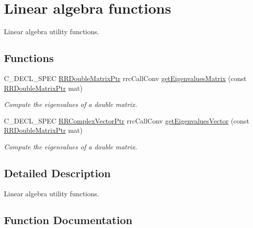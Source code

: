 \hypertarget{group___linear_algebra}{}\section{Linear algebra functions}
\label{group___linear_algebra}


Linear algebra utility functions.  


\subsection*{Functions}
\begin{DoxyCompactItemize}
\item 
C\+\_\+\+D\+E\+C\+L\+\_\+\+S\+P\+E\+C \hyperlink{rrc__types_8h_ae586a879d30f0823087e42d93464b5dd}{R\+R\+Double\+Matrix\+Ptr} rrc\+Call\+Conv \hyperlink{group___linear_algebra_ga142092d1f7edcc6500f1b965abed68be}{get\+Eigenvalues\+Matrix} (const \hyperlink{rrc__types_8h_ae586a879d30f0823087e42d93464b5dd}{R\+R\+Double\+Matrix\+Ptr} mat)
\begin{DoxyCompactList}\small\item\em Compute the eigenvalues of a double matrix. \end{DoxyCompactList}\item 
C\+\_\+\+D\+E\+C\+L\+\_\+\+S\+P\+E\+C \hyperlink{rrc__types_8h_ae05c63419a6ca0575eb327fd04dae4b5}{R\+R\+Complex\+Vector\+Ptr} rrc\+Call\+Conv \hyperlink{group___linear_algebra_ga9902e4c49cc0334f2d2b297b977856c3}{get\+Eigenvalues\+Vector} (const \hyperlink{rrc__types_8h_ae586a879d30f0823087e42d93464b5dd}{R\+R\+Double\+Matrix\+Ptr} mat)
\begin{DoxyCompactList}\small\item\em Compute the eigenvalues of a double matrix. \end{DoxyCompactList}\end{DoxyCompactItemize}


\subsection{Detailed Description}
Linear algebra utility functions. 



\subsection{Function Documentation}
\hypertarget{group___linear_algebra_ga142092d1f7edcc6500f1b965abed68be}{}
